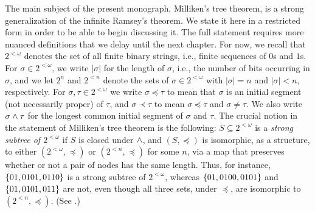 The main subject of the present monograph, Milliken's tree theorem, is a strong generalization of the infinite Ramsey's theorem. We state it here in a restricted form in order to be able to begin discussing it. The full statement requires more nuanced definitions that we delay until the next chapter. For now, we recall that $2^{<\omega}$ denotes the set of all finite binary strings, i.e., finite sequences of $0$s and $1$s. For $\sigma \in 2^{<\omega}$, we write $|\sigma|$ for the length of $\sigma$, i.e., the number of bits occurring in $\sigma$, and we let $2^n$ and $2^{<n}$ denote the sets of $\sigma \in 2^{<\omega}$ with $|\sigma| = n$ and $|\sigma| < n$, respectively. For $\sigma,\tau \in 2^{<\omega}$ we write $\sigma \preceq \tau$ to mean that $\sigma$ is an initial segment (not necessarily proper) of $\tau$, and $\sigma \prec \tau$ to mean $\sigma \preceq \tau$ and $\sigma \neq \tau$. We also write $\sigma \wedge \tau$ for the longest common initial segment of $\sigma$ and $\tau$. The crucial notion in the statement of Milliken's tree theorem is the following: $S \subseteq 2^{<\omega}$ is a \emph{strong subtree of $2^{<\omega}$} if $S$ is closed under $\wedge$, and $(S,\preceq)$ is isomorphic, as a structure, to either $(2^{<\omega},\preceq)$ or $(2^{< n},\preceq)$ for some $n$, via a map that preserves whether or not a pair of nodes has the same length. Thus, for instance, $\{ 01, 0101, 0110 \}$ is a strong subtree of $2^{<\omega}$, whereas $\{ 01, 0100, 0101 \}$ and $\{ 01, 0101, 011 \}$ are not, even though all three sets, under $\preceq$, are isomorphic to $(2^{< n},\preceq)$. (See .)

